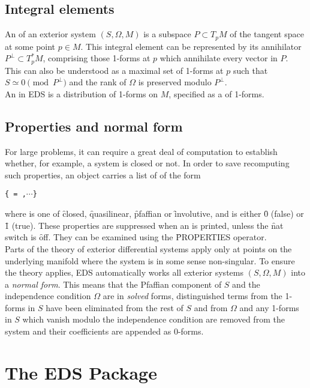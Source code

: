 \subsection{Integral elements}
An  of an exterior system $(S,\Omega,M)$ is a subspace
$P \subset T_pM$ of the tangent space at some point $p \in M$. This integral
element can be represented by its annihilator $P^\perp \subset T^*_pM$, comprising
those 1-forms at $p$ which annihilate every vector in $P$. This can also be understood
as a maximal set of 1-forms at $p$ such that $S \simeq 0 \pmod{P^\perp}$ and the
rank of $\Omega$ is preserved modulo $P^\perp$. \\
An  in EDS is a distribution of 1-forms on $M$,
specified as a  of 1-forms.

\subsection{Properties and normal form}
For large problems, it can require a great deal of computation to establish
whether, for example, a system is closed or not. In order to save
recomputing such properties, an  object carries a list of
 of the form 
\begin{list}{}
\item {\tt \{ = ,$\cdots$\}}
\end{list}
where  is one of \f{closed}, \f{quasilinear}, \f{pfaffian} or
\f{involutive}, and  is either \f{0} (false) or \f{1}
(true). These properties are suppressed when an  is printed,
unless the \f{nat} switch is \f{off}. They can be examined using the
\f{PROPERTIES} operator. \\
Parts of the theory of exterior differential systems apply only at points
on the underlying manifold where the system is in some sense
non-singular. To ensure the theory applies, EDS automatically works all
exterior systems $(S,\Omega,M)$ into a {\em normal form}. This means that
the Pfaffian component of $S$ and the independence condition $\Omega$ are 
in {\it solved} forms, distinguished terms from the 1-forms in $S$ have
been eliminated from the rest of $S$ and from $\Omega$ and any 1-forms in
$S$ which vanish modulo the independence condition are removed from the
system and their coefficients are appended as 0-forms.

\section{The EDS Package}

